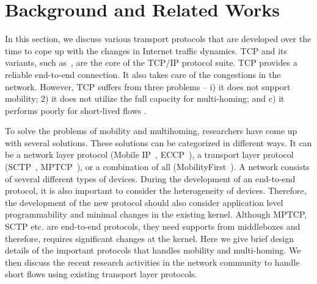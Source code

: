 \section{Background and Related Works}
%
In this section, we discuss various transport protocols that are developed over the time to cope up with the changes in Internet traffic dynamics. TCP and its variants, such as~\cite{wang2014achieving,lukaseder2016comparison,wang2013cubic,de2016throughput}, are the core of the TCP/IP protocol suite. TCP provides a reliable end-to-end connection. It also takes care of the congestions in the network. However, TCP suffers from three problems -- i) it does not support mobility; 2) it does not utilize the full capacity for multi-homing; and c) it performs poorly for short-lived flows \cite{de2016throughput,islam2016start}.

To solve the problems of mobility and multihoming, researchers have come up with several solutions. These solutions can be categorized in different ways. It can be a network layer protocol (Mobile IP~\cite{perkins1997mobile}, ECCP~\cite{arye2012formally}), a transport layer protocol (SCTP~\cite{iyengar2006concurrent}, MPTCP~\cite{mptcpsurvey}), or a combination of all (MobilityFirst~\cite{seskar2011mobilityfirst,raychaudhuri2012mobilityfirst,venkataramani2014mobilityfirst}). A network consists of several different types of devices. During the development of an end-to-end protocol, it is also important to consider the heterogeneity of devices. Therefore, the development of the new protocol should also consider application level programmability and minimal changes in the existing kernel. Although MPTCP, SCTP etc. are end-to-end protocols, they need supports from middleboxes and therefore, requires significant changes at the kernel. Here we give brief design details of the important protocols that handles mobility and multi-homing. We then discuss the recent research activities in the network community to handle short flows using existing transport layer protocols. 


